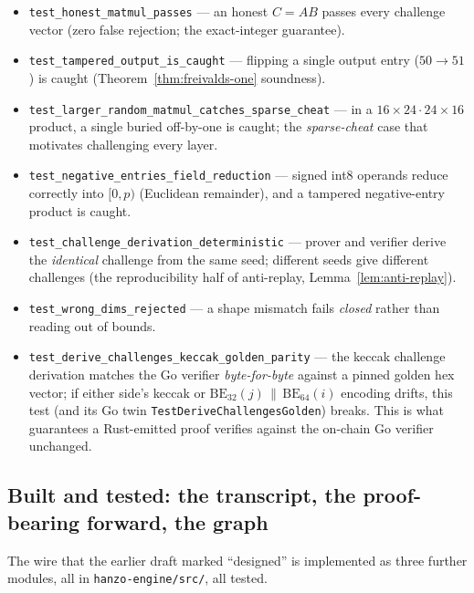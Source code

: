 \begin{itemize}[leftmargin=1.4em]
\item \texttt{test\_honest\_matmul\_passes} --- an honest $C = AB$ passes every challenge
vector (zero false rejection; the exact-integer guarantee).
\item \texttt{test\_tampered\_output\_is\_caught} --- flipping a single output entry
($50 \to 51$) is caught (Theorem~\ref{thm:freivalds-one} soundness).
\item \texttt{test\_larger\_random\_matmul\_catches\_sparse\_cheat} --- in a
$16\times24 \cdot 24\times16$ product, a single buried off-by-one is caught; the
\emph{sparse-cheat} case that motivates challenging every layer.
\item \texttt{test\_negative\_entries\_field\_reduction} --- signed int8 operands reduce
correctly into $[0,p)$ (Euclidean remainder), and a tampered negative-entry product is
caught.
\item \texttt{test\_challenge\_derivation\_deterministic} --- prover and verifier derive
the \emph{identical} challenge from the same seed; different seeds give different
challenges (the reproducibility half of anti-replay, Lemma~\ref{lem:anti-replay}).
\item \texttt{test\_wrong\_dims\_rejected} --- a shape mismatch fails \emph{closed} rather
than reading out of bounds.
\item \texttt{test\_derive\_challenges\_keccak\_golden\_parity} --- the keccak challenge
derivation matches the Go verifier \emph{byte-for-byte} against a pinned golden hex vector;
if either side's keccak or $\mathrm{BE}_{32}(j)\,\|\,\mathrm{BE}_{64}(i)$ encoding drifts,
this test (and its Go twin \texttt{TestDeriveChallengesGolden}) breaks. This is what
guarantees a Rust-emitted proof verifies against the on-chain Go verifier unchanged.
\end{itemize}

\subsection{Built and tested: the transcript, the proof-bearing forward, the graph}

The wire that the earlier draft marked ``designed'' is implemented as three further
modules, all in \texttt{hanzo-engine/src/}, all tested.


